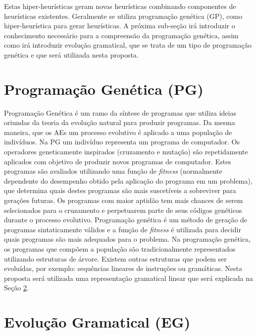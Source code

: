 Estas hiper-heurísticas geram novas heurísticas combinando componentes de heurísticas existentes. Geralmente se utiliza programação genética (GP), como hiper-heurística para gerar heurísticas. A próxima sub-seção irá introduzir o conhecimento necessário para a compreensão da programação genética, assim como irá introduzir evolução gramatical, que se trata de um tipo de programação genética e que será utilizada nesta proposta.

\section{Programação Genética (PG)}
\label{subsection:PG}

Programação Genética \cite{burke2009exploring} é um ramo da síntese de programas que utiliza ideias oriundas da teoria da evolução natural para produzir programas. Da mesma maneira, que os AEs um processo evolutivo é aplicado a uma população de indivíduos. Na PG um indivíduo representa um programa de computador. Os operadores geneticamente inspirados (cruzamento e mutação) são repetidamente aplicados com objetivo de produzir novos programas de computador. Estes programas são avaliados utilizando uma função de \textit{fitness} (normalmente dependente do desempenho obtido pela aplicação do programa em um problema), que determina quais destes programas são mais suscetíveis a sobreviver para gerações futuras. Os programas com maior aptidão tem mais chances de serem selecionados para o cruzamento e perpetuarem parte de seus códigos genéticos durante o processo evolutivo. 
Programação genética é um método de geração de programas sintaticamente válidos e a função de \textit{fitness} é utilizada para decidir quais programas são mais adequados para o problema.
Na programação genética, os programas que compõem a população são tradicionalmente representados utilizando estruturas de árvore. Existem outras estruturas que podem ser evoluídas, por exemplo: sequências lineares de instruções ou gramáticas. Nesta proposta será utilizada uma representação gramatical linear que será explicada na Seção \ref{subsubsection:EvolucaoGramatical}.

\section{Evolução Gramatical (EG)}
\label{subsubsection:EvolucaoGramatical}

